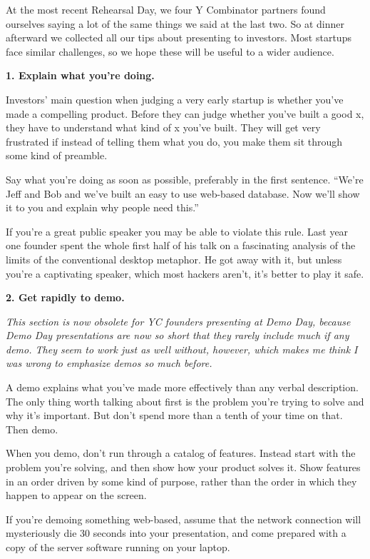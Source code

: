 At the most recent Rehearsal Day, we four Y Combinator partners found
ourselves saying a lot of the same things we said at the last two. So at
dinner afterward we collected all our tips about presenting to
investors. Most startups face similar challenges, so we hope these will
be useful to a wider audience.

\textbf{1. Explain what you're doing.}

Investors' main question when judging a very early startup is whether
you've made a compelling product. Before they can judge whether you've
built a good x, they have to understand what kind of x you've built.
They will get very frustrated if instead of telling them what you do,
you make them sit through some kind of preamble.

Say what you're doing as soon as possible, preferably in the first
sentence. ``We're Jeff and Bob and we've built an easy to use web-based
database. Now we'll show it to you and explain why people need this.''

If you're a great public speaker you may be able to violate this rule.
Last year one founder spent the whole first half of his talk on a
fascinating analysis of the limits of the conventional desktop metaphor.
He got away with it, but unless you're a captivating speaker, which most
hackers aren't, it's better to play it safe.

\textbf{2. Get rapidly to demo.}

\emph{This section is now obsolete for YC founders presenting at Demo
Day, because Demo Day presentations are now so short that they rarely
include much if any demo. They seem to work just as well without,
however, which makes me think I was wrong to emphasize demos so much
before.}

A demo explains what you've made more effectively than any verbal
description. The only thing worth talking about first is the problem
you're trying to solve and why it's important. But don't spend more than
a tenth of your time on that. Then demo.

When you demo, don't run through a catalog of features. Instead start
with the problem you're solving, and then show how your product solves
it. Show features in an order driven by some kind of purpose, rather
than the order in which they happen to appear on the screen.

If you're demoing something web-based, assume that the network
connection will mysteriously die 30 seconds into your presentation, and
come prepared with a copy of the server software running on your laptop.

